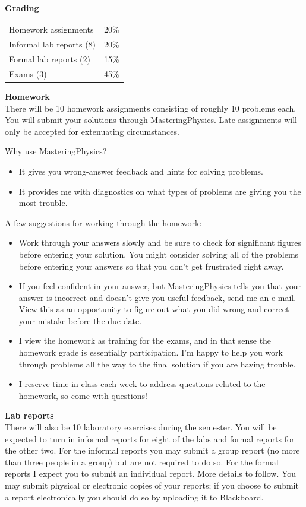 \documentclass[11pt,letterpaper]{article}
\newcommand{\squeezeup}{\vspace{-2.5mm}}
\begin{document}
\clearpage
\textbf{Grading} 
\begin{table}[h!]
\squeezeup
\begin{tabular}{ll}
Homework assignments & 20\%\\
Informal lab reports (8) & 20\%\\
Formal lab reports (2) & 15\%\\
Exams (3) & 45\%
\end{tabular}
\end{table}

\textbf{Homework}\\
There will be 10 homework assignments consisting of roughly 10 problems each. You will submit your solutions through MasteringPhysics. Late assignments will only be accepted for extenuating circumstances.

Why use MasteringPhysics?
\begin{itemize}\itemsep -5pt
\item It gives you wrong-answer feedback and hints for solving problems.
\item It provides me with diagnostics on what types of problems are giving you the most trouble.
\end{itemize}

A few suggestions for working through the homework:
\begin{itemize}\itemsep -5pt
\item Work through your answers slowly and be sure to check for significant figures before entering your solution. You might consider solving all of the problems before entering your answers so that you don't get frustrated right away.
\item If you feel confident in your answer, but MasteringPhysics tells you that your answer is incorrect and doesn't give you useful feedback, send me an e-mail. View this as an opportunity to figure out what you did wrong and correct your mistake before the due date.%
\item I view the homework as training for the exams, and in that sense the homework grade is essentially participation. I'm happy to help you work through problems all the way to the final solution if you are having trouble. 
\item I reserve time in class each week to address questions related to the homework, so come with questions!
\end{itemize}

\textbf{Lab reports}\\
There will also be 10 laboratory exercises during the semester. You will be expected to turn in informal reports for eight of the labs and formal reports for the other two. For the informal reports you may submit a group report (no more than three people in a group) but are not required to do so. For the formal reports I expect you to submit an individual report. More details to follow. You may submit physical or electronic copies of your reports; if you choose to submit a report electronically you should do so by uploading it to Blackboard.
\end{document}
